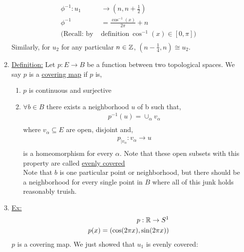 \begin{enumerate}
            \begin{align*}
                \phi^{-1}: u_1&\rightarrow(n,n+\frac{1}{2})\\
                \phi^{-1}&=\frac{\cos^{-1} (x)}{2\pi}+n\\
                (\text{Recall: by }&\text{definition}\ \cos^{-1}(x)\in[0,\pi])\\
            \end{align*}
            Similarly, for $u_2$ for any particular $n\in \mathbb{Z}$, $(n-\frac{1}{4}, n)\cong u_2$.
        \item \underline{Definition:} Let $p:E \rightarrow B$ be a function between two topological spaces. We say
            $p$ is a \underline{covering map} if $p$ is,
            \begin{enumerate}
                \item $p$ is continuous and surjective
                \item $\forall b\in B$ there exists a neighborhood $u$ of b such that,
                    \begin{align*}
                        p^{-1}(u)=\cup_{\alpha}v_{\alpha}\\
                    \end{align*}
                    where $v_\alpha\subseteq E$ are open, disjoint and,
                    \begin{align*}
                        p_{|v_{\alpha}}:v_{\alpha}\rightarrow u\\
                    \end{align*}
                    is a homeomorphism for every $\alpha$. Note that these open subsets with this property are called
                    \underline{evenly covered}\\
                    Note that $b$ is one particular point or neighborhood, but there should be a neighborhood for every single
                    point in $B$ where all of this junk holds reasonably truish.
            \end{enumerate}
        \item \underline{Ex:}
            \begin{align*}
                p: \mathbb{R} \rightarrow S^1\\
                p(x)=(\cos(2\pi x), \sin(2\pi x))\\
            \end{align*}
            $p$ is a covering map. We just showed that $u_1$ is evenly covered:

\end{enumerate}
